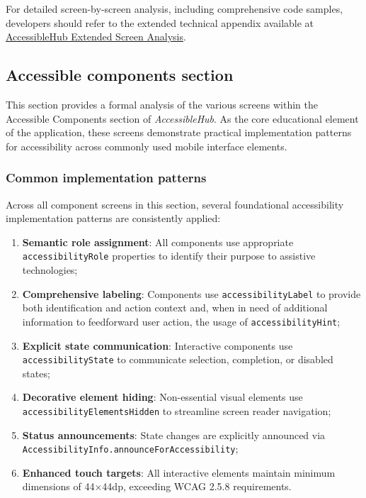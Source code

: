 For detailed screen-by-screen analysis, including comprehensive code samples, developers should refer to the extended technical appendix available at \href{https://github.com/gabrielrovesti/AccessibleHub/blob/main/Technical\%20Thesis\%20Appendix/AccessibleHub\%20-\%20Extended\%20screen\%20analysis.pdf}{AccessibleHub Extended Screen Analysis}.

\subsection{Accessible components section}
\label{subsec:accessible-components}

This section provides a formal analysis of the various screens within the Accessible Components section of \textit{AccessibleHub}. As the core educational element of the application, these screens demonstrate practical implementation patterns for accessibility across commonly used mobile interface elements. 

\subsubsection{Common implementation patterns}
\label{subsubsec:common-patterns}

Across all component screens in this section, several foundational accessibility implementation patterns are consistently applied:

\begin{enumerate}
    \item \textbf{Semantic role assignment}: All components use appropriate \texttt{accessibilityRole} properties to identify their purpose to assistive technologies;
    
    \item \textbf{Comprehensive labeling}: Components use \texttt{accessibilityLabel} to provide both identification and action context and, when in need of additional information to feedforward user action, the usage of \texttt{accessibilityHint};
    
    \item \textbf{Explicit state communication}: Interactive components use \texttt{accessibilityState} to communicate selection, completion, or disabled states;
    
    \item \textbf{Decorative element hiding}: Non-essential visual elements use \\\texttt{accessibilityElementsHidden} to streamline screen reader navigation;
    
    \item \textbf{Status announcements}: State changes are explicitly announced via \\\texttt{AccessibilityInfo.announceForAccessibility};
    
    \item \textbf{Enhanced touch targets}: All interactive elements maintain minimum dimensions of 44×44dp, exceeding WCAG 2.5.8 requirements.
\end{enumerate}

